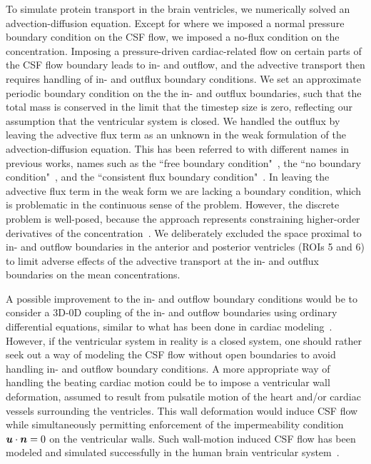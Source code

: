 \documentclass{WileyMSP-template}
\begin{document}
To simulate protein transport in the brain ventricles, we numerically solved
an advection-diffusion equation. Except for where we imposed a normal pressure
boundary condition on the CSF flow,
we imposed a no-flux condition on the concentration. Imposing a pressure-driven
cardiac-related flow on certain parts of the CSF flow boundary leads to in- and outflow,
and the advective transport then requires handling of in- and outflux boundary conditions.
We set an approximate periodic boundary condition on the the in- and outflux boundaries,
such that the total mass is conserved in the
limit that the timestep size is zero, reflecting our assumption that the
ventricular system is closed.
We handled the outflux by leaving the advective flux term as an unknown in the weak formulation
of the advection-diffusion equation. This has been referred to with different names
in previous works, names such as the ``free boundary condition"~\cite{Papanastasiou1992ACondition},
the ``no boundary condition"~\cite{Griffiths1997TheCondition}, and the 
``consistent flux boundary condition"~\cite{Lynch2020NumericalHemodynamics}. 
In leaving the advective flux term in the weak form we are lacking a boundary condition,
which is problematic in the continuous sense of the problem.
However, the discrete problem is well-posed, because the approach represents
constraining higher-order derivatives of the concentration~\cite{Griffiths1997TheCondition}. 
We deliberately excluded the space proximal to in- and outflow boundaries in
the anterior and posterior ventricles (ROIs 5 and 6) to limit adverse effects of 
the advective transport at the in- and outflux boundaries on the mean concentrations. 

A possible improvement to the in- and outflow boundary conditions would be
to consider a 3D-0D coupling of the in- and outflow boundaries using
ordinary differential equations,
similar to what has been done in cardiac
modeling~\cite{Brown2024AMechanics, Augustin2021ACirculation}.
However, if the ventricular system in reality is a closed system,
one should rather seek out a way of modeling the CSF flow without open boundaries to avoid
handling in- and outflow boundary conditions. A more appropriate way of handling the beating
cardiac motion could be to impose a ventricular wall deformation, assumed to result from pulsatile
motion of the heart and/or cardiac vessels surrounding the ventricles. This wall deformation would
induce CSF flow while simultaneously permitting enforcement of the impermeability condition
$\bm{u}\cdot\bm{n}=0$ on the ventricular walls. Such wall-motion induced CSF flow has been modeled and
simulated successfully in the human brain ventricular system~\cite{Causemann2022HumanFramework,
Kurtcuoglu2005ComputationalSystem, Kurtcuoglu2007ComputationalSylvius, Linninger2005PulsatileBrain}.
\end{document}
